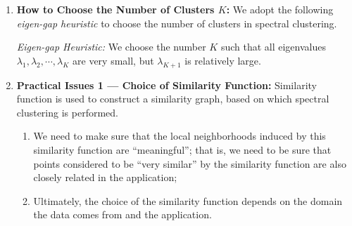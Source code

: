 \documentclass[12pt]{article}
\begin{document}
\begin{enumerate}[label=\textbf{\arabic*.}]
\begin{enumerate}
		\begin{proof}
			First note that 
			\begin{align*}
				\Pr \parens{X_0 \in A, X_1 \in B} = & \, \sum_{\sets{\parens{i, i'} \,\vert\, \bx_i \in A, \bx_{i'} \in B}} \Pr \parens{X_0 = \bx_i, X_1 = \bx_{i'}} \\ 
				= & \, \sum_{\sets{\parens{i, i'} \,\vert\, \bx_i \in A, \bx_{i'} \in B}} \pi_i p_{i, i'} \\ 
				= & \, \sum_{\sets{\parens{i, i'} \,\vert\, \bx_i \in A, \bx_{i'} \in B}} \frac{d_i}{\mathrm{vol} \parens{V}} \frac{w_{i, i'}}{d_i} \\ 
				= & \, \frac{1}{\mathrm{vol} \parens{V}} \sum_{\sets{\parens{i, i'} \,\vert\, \bx_i \in A, \bx_{i'} \in B}} w_{i, i'}. 
			\end{align*}
			Then, we have 
			\begin{align*}
				\Pr \parens{X_1 \in B \,\vert\, X_0 \in A} = & \, \frac{\Pr \parens{X_0 \in A, X_1 \in B}}{\Pr \parens{X_0 \in A}} \\ 
				= & \, \parens[\bigg]{\frac{1}{\mathrm{vol} \parens{V}} \sum_{\sets{\parens{i, i'} \,\vert\, \bx_i \in A, \bx_{i'} \in B}} w_{i, i'}} \parens[\bigg]{\frac{\mathrm{vol} \parens{A}}{\mathrm{vol} \parens{V}}}^{-1} \\ 
				= & \, \frac{1}{\mathrm{vol} \parens{A}} \sum_{\sets{\parens{i, i'} \,\vert\, \bx_i \in A, \bx_{i'} \in B}} w_{i, i'}. 
			\end{align*}
			The desired result follows from the definition of $\mathrm{NCut}$. 
		\end{proof}

	\end{enumerate}
	
	\item \textbf{How to Choose the Number of Clusters $K$:} We adopt the following \emph{eigen-gap heuristic} to choose the number of clusters in spectral clustering. 
	
	\emph{Eigen-gap Heuristic:} We choose the number $K$ such that all eigenvalues $\lambda_1, \lambda_2, \cdots, \lambda_K$ are very small, but $\lambda_{K+1}$ is relatively large. 
	
	\item \textbf{Practical Issues 1 --- Choice of Similarity Function:} Similarity function is used to construct a similarity graph, based on which spectral clustering is performed. 
	\begin{enumerate}
		\item We need to make sure that the local neighborhoods induced by this similarity function are ``meaningful''; that is, we need to be sure that points considered to be ``very similar'' by the similarity function are also closely related in the application; 
		\item Ultimately, the choice of the similarity function depends on the domain the data comes from and the application. 
	\end{enumerate}
	

\end{enumerate}
\end{document}
